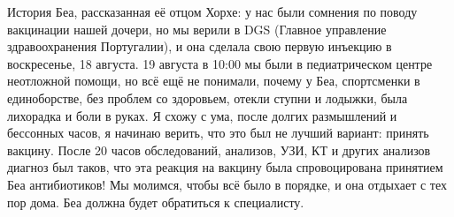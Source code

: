 История Беа, рассказанная её отцом Хорхе: у нас были сомнения по поводу
вакцинации нашей дочери, но мы верили в DGS (Главное управление здравоохранения
Португалии), и она сделала свою первую инъекцию в воскресенье, 18 августа. 19
августа в 10:00 мы были в педиатрическом центре неотложной помощи, но всё ещё не
понимали, почему у Беа, спортсменки в единоборстве, без проблем со здоровьем,
отекли ступни и лодыжки, была лихорадка и боли в руках. Я схожу с ума, после
долгих размышлений и бессонных часов, я начинаю верить, что это был не лучший
вариант: принять вакцину. После 20 часов обследований, анализов, УЗИ, КТ и
других анализов диагноз был таков, что эта реакция на вакцину была
спровоцирована принятием Беа антибиотиков! Мы молимся, чтобы всё было в порядке,
и она отдыхает с тех пор дома. Беа должна будет обратиться к специалисту.
